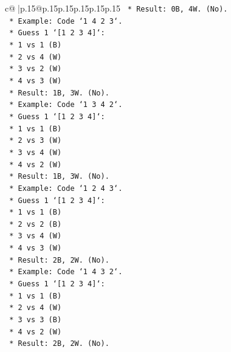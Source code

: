 \documentclass{article}
\begin{document}
{\begin{supertabular}{c@{$\;$}|p{.15\linewidth}@{}p{.15\linewidth}p{.15\linewidth}p{.15\linewidth}p{.15\linewidth}p{.15\linewidth}}
{{{\texttt{                    *   Result: 0B, 4W. (No).} \\
\texttt{            *   Example: Code `1 4 2 3`.} \\
\texttt{                *   Guess 1 `{[}1 2 3 4{]}`:} \\
\texttt{                    *   1 vs 1 (B)} \\
\texttt{                    *   2 vs 4 (W)} \\
\texttt{                    *   3 vs 2 (W)} \\
\texttt{                    *   4 vs 3 (W)} \\
\texttt{                    *   Result: 1B, 3W. (No).} \\
\texttt{            *   Example: Code `1 3 4 2`.} \\
\texttt{                *   Guess 1 `{[}1 2 3 4{]}`:} \\
\texttt{                    *   1 vs 1 (B)} \\
\texttt{                    *   2 vs 3 (W)} \\
\texttt{                    *   3 vs 4 (W)} \\
\texttt{                    *   4 vs 2 (W)} \\
\texttt{                    *   Result: 1B, 3W. (No).} \\
\texttt{            *   Example: Code `1 2 4 3`.} \\
\texttt{                *   Guess 1 `{[}1 2 3 4{]}`:} \\
\texttt{                    *   1 vs 1 (B)} \\
\texttt{                    *   2 vs 2 (B)} \\
\texttt{                    *   3 vs 4 (W)} \\
\texttt{                    *   4 vs 3 (W)} \\
\texttt{                    *   Result: 2B, 2W. (No).} \\
\texttt{            *   Example: Code `1 4 3 2`.} \\
\texttt{                *   Guess 1 `{[}1 2 3 4{]}`:} \\
\texttt{                    *   1 vs 1 (B)} \\
\texttt{                    *   2 vs 4 (W)} \\
\texttt{                    *   3 vs 3 (B)} \\
\texttt{                    *   4 vs 2 (W)} \\
\texttt{                    *   Result: 2B, 2W. (No).} \\
}}}
\end{supertabular}}
\end{document}

